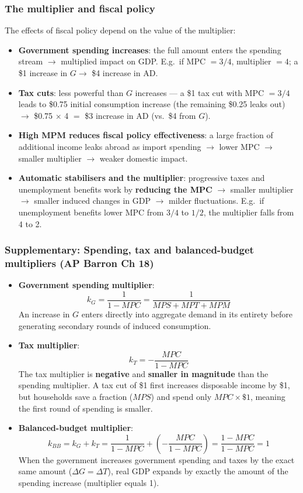 \documentclass[a4paper,12pt]{article}
\newcommand{\needbold}[1]{\textcolor{red!70!black}{\textbf{#1}}}
\begin{document}
\subsubsection*{The multiplier and fiscal policy}
The effects of fiscal policy depend on the value of the multiplier:
\begin{itemize}
  \item \textbf{Government spending increases}: the full amount enters the spending stream $\to$ multiplied impact on GDP. E.g.\ if MPC $= 3/4$, multiplier $= 4$; a \$1 increase in $G \to$ \$4 increase in AD.
  \item \textbf{Tax cuts}: less powerful than $G$ increases --- a \$1 tax cut with MPC $= 3/4$ leads to \$0.75 initial consumption increase (the remaining \$0.25 leaks out) $\to$ \$0.75 $\times$ 4 $=$ \$3 increase in AD (vs.\ \$4 from $G$).
  \item \textbf{High MPM reduces fiscal policy effectiveness}: a large fraction of additional income leaks abroad as import spending $\to$ lower MPC $\to$ smaller multiplier $\to$ weaker domestic impact.
  \item \textbf{Automatic stabilisers and the multiplier}: progressive taxes and unemployment benefits work by \textbf{reducing the MPC} $\to$ smaller multiplier $\to$ smaller induced changes in GDP $\to$ milder fluctuations. E.g.\ if unemployment benefits lower MPC from $3/4$ to $1/2$, the multiplier falls from 4 to 2.
\end{itemize}

\subsubsection*{Supplementary: Spending, tax and balanced-budget multipliers (AP Barron Ch 18)}
\begin{itemize}
  \item \needbold{Government spending multiplier}:
  \[k_G = \dfrac{1}{1-MPC} = \dfrac{1}{MPS+MPT+MPM}\]
  An increase in $G$ enters directly into aggregate demand in its entirety before generating secondary rounds of induced consumption.
  \item \needbold{Tax multiplier}:
  \[k_T = -\dfrac{MPC}{1-MPC}\]
  The tax multiplier is \textbf{negative} and \textbf{smaller in magnitude} than the spending multiplier. A tax cut of \$1 first increases disposable income by \$1, but households save a fraction ($MPS$) and spend only $MPC \times \$1$, meaning the first round of spending is smaller.
  \item \needbold{Balanced-budget multiplier}:
  \[k_{BB} = k_G + k_T = \dfrac{1}{1-MPC} + \left(-\dfrac{MPC}{1-MPC}\right) = \dfrac{1-MPC}{1-MPC} = 1\]
  When the government increases government spending and taxes by the exact same amount ($\Delta G = \Delta T$), real GDP expands by exactly the amount of the spending increase (multiplier equals 1).
\end{itemize}
\end{document}
